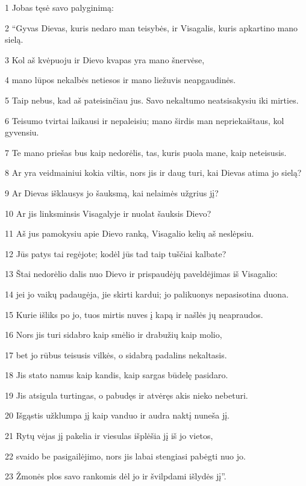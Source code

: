 \par 1 Jobas tęsė savo palyginimą: 
\par 2 “Gyvas Dievas, kuris nedaro man teisybės, ir Visagalis, kuris apkartino mano sielą. 
\par 3 Kol aš kvėpuoju ir Dievo kvapas yra mano šnervėse, 
\par 4 mano lūpos nekalbės netiesos ir mano liežuvis neapgaudinės. 
\par 5 Taip nebus, kad aš pateisinčiau jus. Savo nekaltumo neatsisakysiu iki mirties. 
\par 6 Teisumo tvirtai laikausi ir nepaleisiu; mano širdis man nepriekaištaus, kol gyvensiu. 
\par 7 Te mano priešas bus kaip nedorėlis, tas, kuris puola mane, kaip neteisusis. 
\par 8 Ar yra veidmainiui kokia viltis, nors jis ir daug turi, kai Dievas atima jo sielą? 
\par 9 Ar Dievas išklausys jo šauksmą, kai nelaimės užgrius jį? 
\par 10 Ar jis linksminsis Visagalyje ir nuolat šauksis Dievo? 
\par 11 Aš jus pamokysiu apie Dievo ranką, Visagalio kelių aš neslėpsiu. 
\par 12 Jūs patys tai regėjote; kodėl jūs tad taip tuščiai kalbate? 
\par 13 Štai nedorėlio dalis nuo Dievo ir prispaudėjų paveldėjimas iš Visagalio: 
\par 14 jei jo vaikų padaugėja, jie skirti kardui; jo palikuonys nepasisotina duona. 
\par 15 Kurie išliks po jo, tuos mirtis nuves į kapą ir našlės jų neapraudos. 
\par 16 Nors jis turi sidabro kaip smėlio ir drabužių kaip molio, 
\par 17 bet jo rūbus teisusis vilkės, o sidabrą padalins nekaltasis. 
\par 18 Jis stato namus kaip kandis, kaip sargas būdelę pasidaro. 
\par 19 Jis atsigula turtingas, o pabudęs ir atvėręs akis nieko nebeturi. 
\par 20 Išgąstis užklumpa jį kaip vanduo ir audra naktį nuneša jį. 
\par 21 Rytų vėjas jį pakelia ir viesulas išplėšia jį iš jo vietos, 
\par 22 svaido be pasigailėjimo, nors jis labai stengiasi pabėgti nuo jo. 
\par 23 Žmonės plos savo rankomis dėl jo ir švilpdami išlydės jį”.



